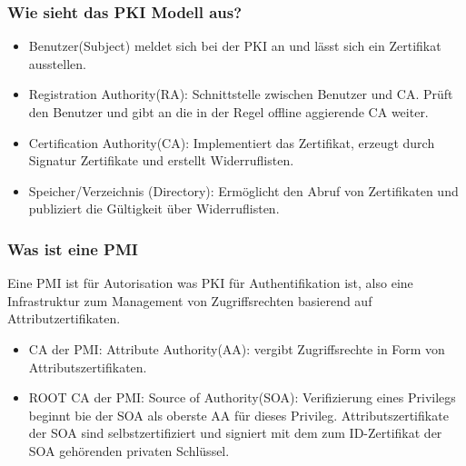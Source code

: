 	\subsubsection{Wie sieht das PKI Modell aus?}
	\begin{itemize}
		\item Benutzer(Subject) meldet sich bei der PKI an und lässt sich ein Zertifikat ausstellen.
		\item Registration Authority(RA): Schnittstelle zwischen Benutzer und CA. Prüft den Benutzer und gibt an die in der Regel offline aggierende CA weiter.
		\item Certification Authority(CA): Implementiert das Zertifikat, erzeugt durch Signatur Zertifikate und erstellt Widerruflisten.
		\item Speicher/Verzeichnis (Directory): Ermöglicht den Abruf von Zertifikaten und publiziert die Gültigkeit über Widerruflisten.
	\end{itemize}
	
	\subsubsection{Was ist eine PMI}
	Eine PMI ist für Autorisation was PKI für Authentifikation ist, also eine Infrastruktur zum Management von Zugriffsrechten basierend auf Attributzertifikaten.
	\begin{itemize}
		\item CA der PMI: Attribute Authority(AA): vergibt Zugriffsrechte in Form von Attributszertifikaten.
		\item ROOT CA der PMI: Source of Authority(SOA): Verifizierung eines Privilegs beginnt bie der SOA als oberste AA für dieses Privileg. Attributszertifikate der SOA sind selbstzertifiziert und signiert mit dem zum ID-Zertifikat der SOA gehörenden privaten Schlüssel.
	\end{itemize}
	
